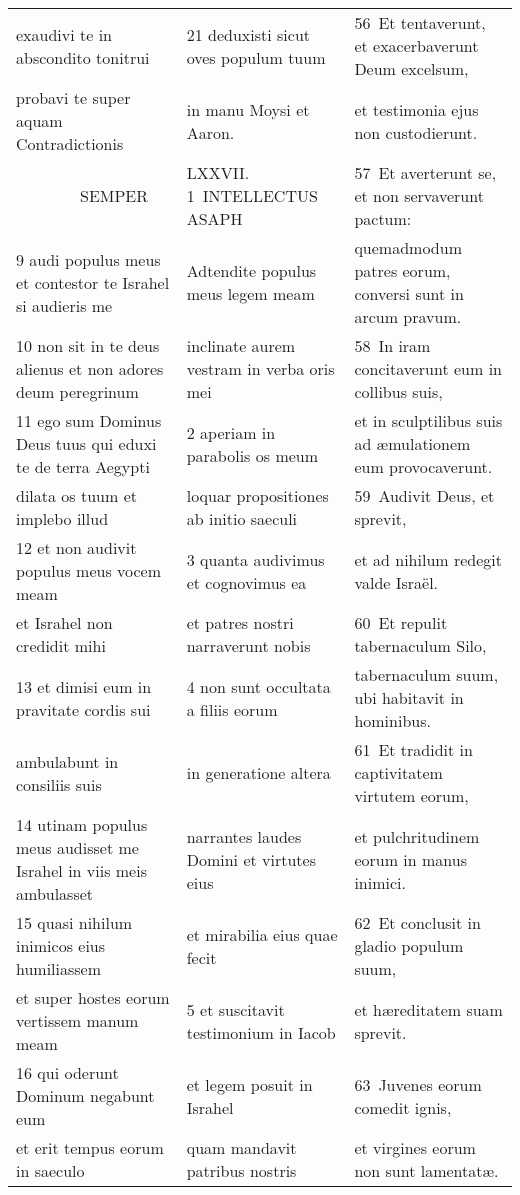\documentclass{article}
\begin{document}
\begin{longtable}{@{}p{}p{}p{}@{}}
exaudivi te in abscondito tonitrui	&	21 deduxisti sicut oves populum tuum	&	56 Et tentaverunt, et exacerbaverunt Deum excelsum,	\\
probavi te super aquam Contradictionis	&	in manu Moysi et Aaron.	&	et testimonia ejus non custodierunt.	\\
    SEMPER	&	LXXVII. 1 INTELLECTUS ASAPH	&	57 Et averterunt se, et non servaverunt pactum:	\\
9 audi populus meus et contestor te Israhel si audieris me	&	Adtendite populus meus legem meam	&	quemadmodum patres eorum, conversi sunt in arcum pravum.	\\
10 non sit in te deus alienus et non adores deum peregrinum	&	inclinate aurem vestram in verba oris mei	&	58 In iram concitaverunt eum in collibus suis,	\\
11 ego sum Dominus Deus tuus qui eduxi te de terra Aegypti	&	2 aperiam in parabolis os meum	&	et in sculptilibus suis ad æmulationem eum provocaverunt.	\\
dilata os tuum et implebo illud	&	loquar propositiones ab initio saeculi	&	59 Audivit Deus, et sprevit,	\\
12 et non audivit populus meus vocem meam	&	3 quanta audivimus et cognovimus ea	&	et ad nihilum redegit valde Israël.	\\
et Israhel non credidit mihi	&	et patres nostri narraverunt nobis	&	60 Et repulit tabernaculum Silo,	\\
13 et dimisi eum in pravitate cordis sui	&	4 non sunt occultata a filiis eorum	&	tabernaculum suum, ubi habitavit in hominibus.	\\
ambulabunt in consiliis suis	&	in generatione altera	&	61 Et tradidit in captivitatem virtutem eorum,	\\
14 utinam populus meus audisset me Israhel in viis meis ambulasset	&	narrantes laudes Domini et virtutes eius	&	et pulchritudinem eorum in manus inimici.	\\
15 quasi nihilum inimicos eius humiliassem	&	et mirabilia eius quae fecit	&	62 Et conclusit in gladio populum suum,	\\
et super hostes eorum vertissem manum meam	&	5 et suscitavit testimonium in Iacob	&	et hæreditatem suam sprevit.	\\
16 qui oderunt Dominum negabunt eum	&	et legem posuit in Israhel	&	63 Juvenes eorum comedit ignis,	\\
et erit tempus eorum in saeculo	&	quam mandavit patribus nostris	&	et virgines eorum non sunt lamentatæ.	\\

\end{longtable}
\end{document}
